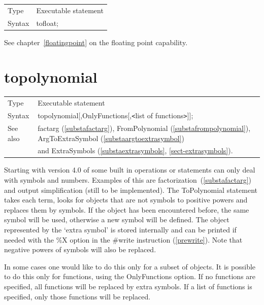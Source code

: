 \noindent \begin{tabular}{ll}
Type & Executable statement\\
Syntax & tofloat;
\end{tabular} \vspace{4mm}

\noindent See chapter~\ref{floatingpoint} on the floating point capability.
 

\section{topolynomial}
\label{substatopolynomial}

\noindent \begin{tabular}{ll}
Type & Executable statement\\
Syntax & topolynomial[,OnlyFunctions[,{\tt<}list of functions{\tt>}]];
\\ See also & factarg (\ref{substafactarg}), FromPolynomial 
(\ref{substafrompolynomial}), ArgToExtraSymbol (\ref{substaargtoextrasymbol}) 
\\& and ExtraSymbols (\ref{substaextrasymbols},
\ref{sect-extrasymbols}).
\end{tabular} \vspace{4mm}

\noindent Starting with version 4.0 of \FORM{} some built in operations or
statements can only deal with symbols and numbers. Examples of this are 
factorization~(\ref{substafactarg}) and output simplification (still to be 
implemented). The ToPolynomial statement takes each term, looks for objects 
that are not symbols to positive powers and replaces them by symbols. If 
the object has been encountered before, the same symbol will be used, 
otherwise a new symbol will be defined. The object represented by the 
`extra symbol' is stored internally and can be printed if needed with the 
\%X option in the \#write instruction (\ref{prewrite}). Note that negative 
powers of symbols will also be replaced.

In some cases one would like to do this only for a subset of objects. It is 
possible to do this only for functions, using the OnlyFunctions option. If 
no functions are specified, all functions will be replaced by extra 
symbols. If a list of functions is specified, only those functions will be 
replaced.
\vspace{10mm}

